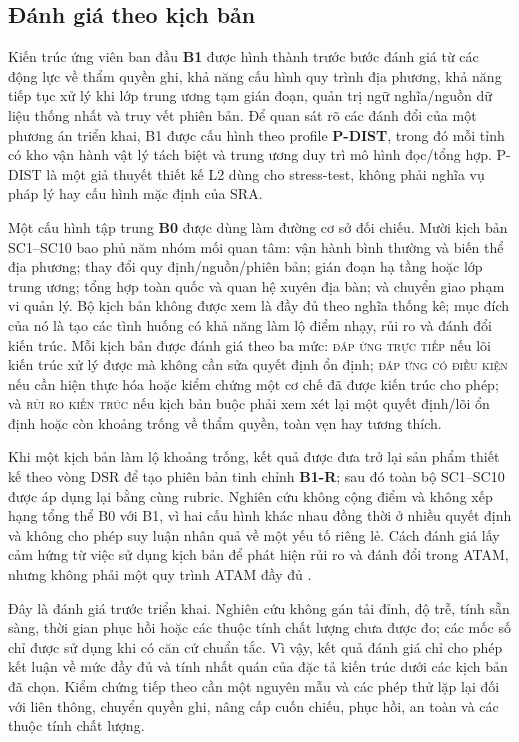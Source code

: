 \subsection{Đánh giá theo kịch bản}
\label{subsec:scenario-method}

Kiến trúc ứng viên ban đầu \textbf{B1} được hình thành trước bước đánh giá từ các động lực về thẩm quyền ghi, khả năng cấu hình quy trình địa phương, khả năng tiếp tục xử lý khi lớp trung ương tạm gián đoạn, quản trị ngữ nghĩa/nguồn dữ liệu thống nhất và truy vết phiên bản. Để quan sát rõ các đánh đổi của một phương án triển khai, B1 được cấu hình theo profile \textbf{P-DIST}, trong đó mỗi tỉnh có kho vận hành vật lý tách biệt và trung ương duy trì mô hình đọc/tổng hợp. P-DIST là một giả thuyết thiết kế L2 dùng cho stress-test, không phải nghĩa vụ pháp lý hay cấu hình mặc định của SRA.

Một cấu hình tập trung \textbf{B0} được dùng làm đường cơ sở đối chiếu. Mười kịch bản SC1--SC10 bao phủ năm nhóm mối quan tâm: vận hành bình thường và biến thể địa phương; thay đổi quy định/nguồn/phiên bản; gián đoạn hạ tầng hoặc lớp trung ương; tổng hợp toàn quốc và quan hệ xuyên địa bàn; và chuyển giao phạm vi quản lý. Bộ kịch bản không được xem là đầy đủ theo nghĩa thống kê; mục đích của nó là tạo các tình huống có khả năng làm lộ điểm nhạy, rủi ro và đánh đổi kiến trúc. Mỗi kịch bản được đánh giá theo ba mức: \textsc{đáp ứng trực tiếp} nếu lõi kiến trúc xử lý được mà không cần sửa quyết định ổn định; \textsc{đáp ứng có điều kiện} nếu cần hiện thực hóa hoặc kiểm chứng một cơ chế đã được kiến trúc cho phép; và \textsc{rủi ro kiến trúc} nếu kịch bản buộc phải xem xét lại một quyết định/lõi ổn định hoặc còn khoảng trống về thẩm quyền, toàn vẹn hay tương thích.

Khi một kịch bản làm lộ khoảng trống, kết quả được đưa trở lại sản phẩm thiết kế theo vòng DSR để tạo phiên bản tinh chỉnh \textbf{B1-R}; sau đó toàn bộ SC1--SC10 được áp dụng lại bằng cùng rubric. Nghiên cứu không cộng điểm và không xếp hạng tổng thể B0 với B1, vì hai cấu hình khác nhau đồng thời ở nhiều quyết định và không cho phép suy luận nhân quả về một yếu tố riêng lẻ. Cách đánh giá lấy cảm hứng từ việc sử dụng kịch bản để phát hiện rủi ro và đánh đổi trong ATAM, nhưng không phải một quy trình ATAM đầy đủ \citep[pp.~3, 5--7]{gallagher2000}.

Đây là đánh giá trước triển khai. Nghiên cứu không gán tải đỉnh, độ trễ, tính sẵn sàng, thời gian phục hồi hoặc các thuộc tính chất lượng chưa được đo; các mốc số chỉ được sử dụng khi có căn cứ chuẩn tắc. Vì vậy, kết quả đánh giá chỉ cho phép kết luận về mức đầy đủ và tính nhất quán của đặc tả kiến trúc dưới các kịch bản đã chọn. Kiểm chứng tiếp theo cần một nguyên mẫu và các phép thử lặp lại đối với liên thông, chuyển quyền ghi, nâng cấp cuốn chiếu, phục hồi, an toàn và các thuộc tính chất lượng.


